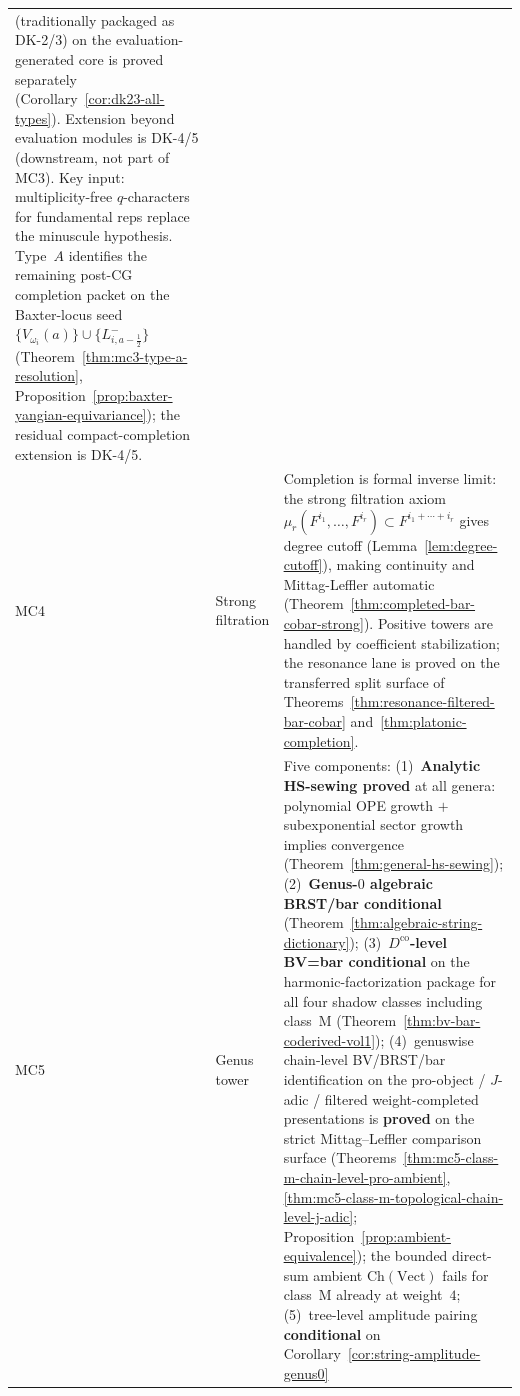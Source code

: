 \begin{center}
\begin{tabular}{@{}llp{7.5cm}@{}}
 \textup{(}traditionally packaged as DK-2/3\textup{)}
 on the evaluation-generated core is proved separately
 (Corollary~\ref{cor:dk23-all-types}).
 Extension beyond evaluation modules is DK-4/5 (downstream, not part of MC3).
 Key input: multiplicity-free $q$-characters for fundamental reps
 \cite{ChariMoura06} replace the minuscule hypothesis.
 Type~$A$ identifies the remaining post-CG completion packet on the
 Baxter-locus seed
 $\{V_{\omega_i}(a)\}\cup\{L^-_{i,a-\frac{1}{2}}\}$
 (Theorem~\ref{thm:mc3-type-a-resolution},
 Proposition~\ref{prop:baxter-yangian-equivariance});
 the residual compact-completion extension is DK-4/5. \\
MC4 & Strong filtration & Completion is formal inverse limit: the strong
 filtration axiom $\mu_r(F^{i_1},\ldots,F^{i_r}) \subset
 F^{i_1+\cdots+i_r}$ gives degree cutoff
 (Lemma~\ref{lem:degree-cutoff}), making continuity
 and Mittag-Leffler automatic
 (Theorem~\ref{thm:completed-bar-cobar-strong}).
 Positive towers are handled by coefficient stabilization; the
 resonance lane is proved on the transferred split surface of
 Theorems~\ref{thm:resonance-filtered-bar-cobar}
 and~\ref{thm:platonic-completion}. \\
MC5 & Genus tower & Five components:
 (1)~\textbf{Analytic HS-sewing proved} at all genera: polynomial OPE growth $+$ subexponential sector growth implies convergence
 (Theorem~\ref{thm:general-hs-sewing});
 (2)~\textbf{Genus-$0$ algebraic BRST/bar conditional}
 (Theorem~\ref{thm:algebraic-string-dictionary});
 (3)~\textbf{$D^{\mathrm{co}}$-level BV=bar conditional} on the
 harmonic-factorization package for all four shadow classes including class~M
 (Theorem~\ref{thm:bv-bar-coderived-vol1});
 (4)~genuswise chain-level BV/BRST/bar identification on the
 pro-object / $J$-adic / filtered weight-completed presentations is
 \textbf{proved} on the strict Mittag--Leffler comparison surface
 \textup{(}Theorems~\ref{thm:mc5-class-m-chain-level-pro-ambient},
 \ref{thm:mc5-class-m-topological-chain-level-j-adic};
 Proposition~\ref{prop:ambient-equivalence}\textup{)};
 the bounded direct-sum ambient $\mathrm{Ch}(\mathrm{Vect})$
 fails for class~M already at weight~$4$;
 (5)~tree-level amplitude pairing \textbf{conditional} on
 Corollary~\ref{cor:string-amplitude-genus0} \\
\bottomrule
\end{tabular}
\end{center}

